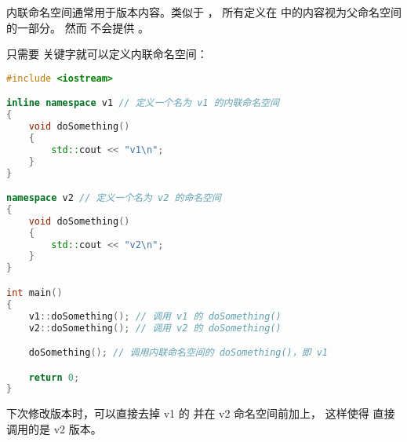 \documentclass[../../LearnCpp.tex]{subfiles}
\begin{document}
内联命名空间通常用于版本内容。类似于 ，
所有定义在  中的内容视为父命名空间的一部分。
然而  不会提供 。

只需要  关键字就可以定义内联命名空间：

\begin{lstlisting}[language=C++]
#include <iostream>

inline namespace v1 // 定义一个名为 v1 的内联命名空间
{
    void doSomething()
    {
        std::cout << "v1\n";
    }
}

namespace v2 // 定义一个名为 v2 的命名空间
{
    void doSomething()
    {
        std::cout << "v2\n";
    }
}

int main()
{
    v1::doSomething(); // 调用 v1 的 doSomething()
    v2::doSomething(); // 调用 v2 的 doSomething()

    doSomething(); // 调用内联命名空间的 doSomething()，即 v1

    return 0;
}
\end{lstlisting}

下次修改版本时，可以直接去掉 v1 的  并在 v2 命名空间前加上，
这样使得  直接调用的是 v2 版本。
\end{document}
